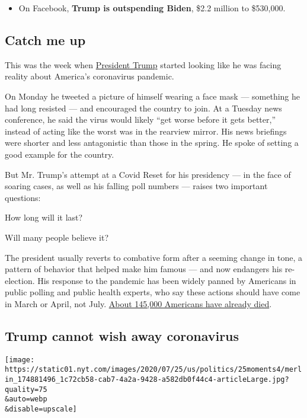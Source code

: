 \begin{itemize}
\tightlist
\item
  On Facebook, \textbf{Trump is outspending Biden}, \$2.2 million to
  \$530,000.
\end{itemize}

\hypertarget{catch-me-up}{%
\subsection{Catch me up}\label{catch-me-up}}

This was the week when
\href{https://www.nytimes.com/interactive/2020/us/elections/donald-trump.html}{President
Trump} started looking like he was facing reality about America's
coronavirus pandemic.

On Monday he tweeted a picture of himself wearing a face mask ---
something he had long resisted --- and encouraged the country to join.
At a Tuesday news conference, he said the virus would likely ``get worse
before it gets better,'' instead of acting like the worst was in the
rearview mirror. His news briefings were shorter and less antagonistic
than those in the spring. He spoke of setting a good example for the
country.

But Mr. Trump's attempt at a Covid Reset for his presidency --- in the
face of soaring cases, as well as his falling poll numbers --- raises
two important questions:

How long will it last?

Will many people believe it?

The president usually reverts to combative form after a seeming change
in tone, a pattern of behavior that helped make him famous --- and now
endangers his re-election. His response to the pandemic has been widely
panned by Americans in public polling and public health experts, who say
these actions should have come in March or April, not July.
\href{https://www.nytimes.com/interactive/2020/us/coronavirus-us-cases.html}{About
145,000 Americans have already died}.

\hypertarget{trump-cannot-wish-away-coronavirus}{%
\subsection{Trump cannot wish away
coronavirus}\label{trump-cannot-wish-away-coronavirus}}

\texttt{[image: https://static01.nyt.com/images/2020/07/25/us/politics/25moments4/merlin\_174881496\_1c72cb58-cab7-4a2a-9428-a582db0f44c4-articleLarge.jpg?quality=75\\\&auto=webp\\\&disable=upscale]}

